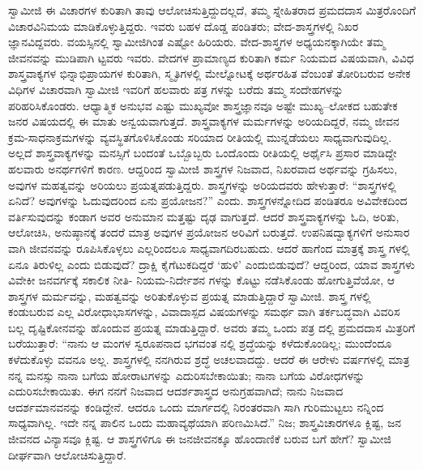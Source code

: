 ಸ್ವಾಮೀಜಿ ಈ ವಿಚಾರಗಳ ಕುರಿತಾಗಿ ತಾವು ಆಲೋಚಿಸುತ್ತಿದ್ದುದಲ್ಲದೆ, ತಮ್ಮ ಸ್ನೇಹಿತರಾದ ಪ್ರಮದದಾಸ ಮಿತ್ರರೊಂದಿಗೆ ವಿಚಾರವಿನಿಮಯ ಮಾಡಿಕೊಳ್ಳುತ್ತಿದ್ದರು. ಇವರು ಬಹಳ ದೊಡ್ಡ ಪಂಡಿತರು; ವೇದ-ಶಾಸ್ತ್ರಗಳಲ್ಲಿ ನಿಖರ ಜ್ಞಾನವಿದ್ದವರು. ವಯಸ್ಸಿನಲ್ಲಿ ಸ್ವಾಮೀಜಿಗಿಂತ ಎಷ್ಟೋ ಹಿರಿಯರು. ವೇದ-ಶಾಸ್ತ್ರಗಳ ಅಧ್ಯಯನಕ್ಕಾಗಿಯೇ ತಮ್ಮ ಜೀವನವನ್ನು ಮುಡಿಪಾಗಿ ಟ್ಟವರು ಇವರು. ವೇದಗಳ ಪ್ರಾಮಾಣ್ಯದ ಕುರಿತಾಗಿ ಕರ್ಮ ನಿಯಮದ ವಿಷಯವಾಗಿ, ವಿವಿಧ ಶಾಸ್ತ್ರವಾಕ್ಯಗಳ ಭಿನ್ನಾಭಿಪ್ರಾಯಗಳ ಕುರಿತಾಗಿ, ಸ್ಮೃತಿಗಳಲ್ಲಿ ಮೇಲ್ನೋಟಕ್ಕೆ ಅರ್ಥರಹಿತ ವೆಂಬಂತೆ ತೋರಿಬರುವ ಅನೇಕ ವಿಧಿಗಳ ವಿಚಾರವಾಗಿ ಸ್ವಾಮೀಜಿ ಇವರಿಗೆ ಹಲವಾರು ಪತ್ರ ಗಳನ್ನು ಬರೆದು ತಮ್ಮ ಸಂದೇಹಗಳನ್ನು ಪರಿಹರಿಸಿಕೊಂಡರು. ಆಧ್ಯಾತ್ಮಿಕ ಅನುಭವ ಎಷ್ಟು ಮುಖ್ಯವೋ ಶಾಸ್ತ್ರಜ್ಞಾನವೂ ಅಷ್ಟೇ ಮುಖ್ಯ–ಲೋಕದ ಬಹುತೇಕ ಜನರ ವಿಷಯದಲ್ಲಿ ಈ ಮಾತು ಅನ್ವಯವಾಗುತ್ತದೆ. ಶಾಸ್ತ್ರವಾಕ್ಯಗಳ ಮರ್ಮಗಳನ್ನು ಅರಿಯದಿದ್ದರೆ, ನಮ್ಮ ಜೀವನ ಕ್ರಮ-ಸಾಧನಾಕ್ರಮಗಳನ್ನು ವ್ಯವಸ್ಥಿತಗೊಳಿಸಿಕೊಂಡು ಸರಿಯಾದ ರೀತಿಯಲ್ಲಿ ಮುನ್ನಡೆಯಲು ಸಾಧ್ಯವಾಗುವುದಿಲ್ಲ. ಅಲ್ಲದೆ ಶಾಸ್ತ್ರವಾಕ್ಯಗಳನ್ನು ಮನಸ್ಸಿಗೆ ಬಂದಂತೆ ಒಬ್ಬೊಬ್ಬರು ಒಂದೊಂದು ರೀತಿಯಲ್ಲಿ ಅರ್ಥೈಸಿ ಪ್ರಸಾರ ಮಾಡಿದ್ದೇ ಹಲವಾರು ಅನರ್ಥಗಳಿಗೆ ಕಾರಣ. ಆದ್ದರಿಂದ ಸ್ವಾಮೀಜಿ ಶಾಸ್ತ್ರಗಳ ನಿಜವಾದ, ನಿಖರವಾದ ಅರ್ಥವನ್ನು ಗ್ರಹಿಸಲು, ಅವುಗಳ ಮಹತ್ವವನ್ನು ಅರಿಯಲು ಪ್ರಯತ್ನಪಡುತ್ತಿದ್ದರು. ಶಾಸ್ತ್ರಗಳನ್ನು ಅರಿಯದವರು ಹೇಳುತ್ತಾರೆ: “ಶಾಸ್ತ್ರಗಳಲ್ಲಿ ಏನಿದೆ? ಅವುಗಳನ್ನು ಓದುವುದರಿಂದ ಏನು ಪ್ರಯೋಜನ?” ಎಂದು. ಶಾಸ್ತ್ರಗಳನ್ನೋದಿದ ಪಂಡಿತರೂ ಅವಿವೇಕದಿಂದ ವರ್ತಿಸುವುದನ್ನು ಕಂಡಾಗ ಅವರ ಅನುಮಾನ ಮತ್ತಷ್ಟು ದೃಢ ವಾಗುತ್ತದೆ. ಆದರೆ ಶಾಸ್ತ್ರವಾಕ್ಯಗಳನ್ನು ಓದಿ, ಅರಿತು, ಆಲೋಚಿಸಿ, ಅನುಷ್ಠಾನಕ್ಕೆ ತಂದರೆ ಮಾತ್ರ ಅವುಗಳ ಪ್ರಯೋಜನ ಅರಿವಿಗೆ ಬರುತ್ತದೆ. ಉಪನಿಷದ್ವಾಕ್ಯಗಳಿಗೆ ಅನುಸಾರ ವಾಗಿ ಜೀವನವನ್ನು ರೂಪಿಸಿಕೊಳ್ಳಲು ಎಲ್ಲರಿಂದಲೂ ಸಾಧ್ಯವಾಗದಿರಬಹುದು. ಆದರೆ ಹಾಗೆಂದ ಮಾತ್ರಕ್ಕೆ ಶಾಸ್ತ್ರ ಗಳಲ್ಲಿ ಏನೂ ತಿರುಳಿಲ್ಲ ಎಂದು ಬಿಡುವುದೆ? ದ್ರಾಕ್ಷಿ ಕೈಗೆಟುಕದಿದ್ದರೆ ‘ಹುಳಿ’ ಎಂದುಬಿಡುವುದೆ? ಆದ್ದರಿಂದ, ಯಾವ ಶಾಸ್ತ್ರಗಳು ವಿವೇಕೀ ಜನವರ್ಗಕ್ಕೆ ಸಕಾಲಿಕ ನೀತಿ- ನಿಯಮ-ನಿರ್ದೇಶನ ಗಳನ್ನು ಕೊಟ್ಟು ನಡೆಸಿಕೊಂಡು ಹೋಗುತ್ತಿವೆಯೋ, ಆ ಶಾಸ್ತ್ರಗಳ ಮರ್ಮವನ್ನು, ಮಹತ್ವವನ್ನು ಅರಿತುಕೊಳ್ಳುವ ಪ್ರಯತ್ನ ಮಾಡುತ್ತಿದ್ದಾರೆ ಸ್ವಾಮೀಜಿ. ಶಾಸ್ತ್ರ ಗಳಲ್ಲಿ ಕಂಡುಬರುವ ಎಲ್ಲ ವಿರೋಧಾಭಾಸಗಳನ್ನು, ವಿವಾದಾಸ್ಪದ ವಿಷಯಗಳನ್ನು ಸಮರ್ಥ ವಾಗಿ ತರ್ಕಬದ್ಧವಾಗಿ ವಿವರಿಸ ಬಲ್ಲ ದೃಷ್ಟಿಕೋನವನ್ನು ಹೊಂದುವ ಪ್ರಯತ್ನ ಮಾಡುತ್ತಿದ್ದಾರೆ. ಅವರು ತಮ್ಮ ಒಂದು ಪತ್ರ ದಲ್ಲಿ ಪ್ರಮದದಾಸ ಮಿತ್ರರಿಗೆ ಬರೆಯುತ್ತಾರೆ: “ನಾನು ಆ ಮಂಗಳ ಸ್ವರೂಪನಾದ ಭಗವಂತ ನಲ್ಲಿ ಶ್ರದ್ಧೆಯನ್ನು ಕಳೆದುಕೊಂಡಿಲ್ಲ; ಮುಂದೆಂದೂ ಕಳೆದುಕೊಳ್ಳು ವವನೂ ಅಲ್ಲ. ಶಾಸ್ತ್ರಗಳಲ್ಲಿ ನನಗಿರುವ ಶ್ರದ್ಧೆ ಅಚಲವಾದದ್ದು. ಆದರೆ ಈ ಆರೇಳು ವರ್ಷಗಳಲ್ಲಿ ಮಾತ್ರ ನನ್ನ ಮನಸ್ಸು ನಾನಾ ಬಗೆಯ ಹೋರಾಟಗಳನ್ನು ಎದುರಿಸಬೇಕಾಯಿತು; ನಾನಾ ಬಗೆಯ ವಿರೋಧಗಳನ್ನು ಎದುರಿಸಬೇಕಾಯಿತು. ಈಗ ನನಗೆ ನಿಜವಾದ ಆದರ್ಶಶಾಸ್ತ್ರದ ಅನುಗ್ರಹವಾಗಿದೆ; ನಾನು ನಿಜವಾದ ಆದರ್ಶಮಾನವನನ್ನು ಕಂಡಿದ್ದೇನೆ. ಆದರೂ ಒಂದು ಮಾರ್ಗದಲ್ಲಿ ನಿರಂತರವಾಗಿ ಸಾಗಿ ಗುರಿಮುಟ್ಟಲು ನನ್ನಿಂದ ಸಾಧ್ಯವಾಗಿಲ್ಲ. ಇದೇ ನನ್ನ ಪಾಲಿನ ಒಂದು ಮಹಾವ್ಯಥೆಯಾಗಿ ಪರಿಣಮಿಸಿದೆ.” ನಿಜ; ಶಾಸ್ತ್ರವಿಚಾರಗಳೂ ಕ್ಲಿಷ್ಟ, ಜನ ಜೀವನದ ವಿನ್ಯಾಸವೂ ಕ್ಲಿಷ್ಟ. ಆ ಶಾಸ್ತ್ರಗಳಿಗೂ ಈ ಜನಜೀವನಕ್ಕೂ ಹೊಂದಾಣಿಕೆ ಬರುವ ಬಗೆ ಹೇಗೆ? ಸ್ವಾಮೀಜಿ ದೀರ್ಘವಾಗಿ ಆಲೋಚಿಸುತ್ತಿದ್ದಾರೆ.

